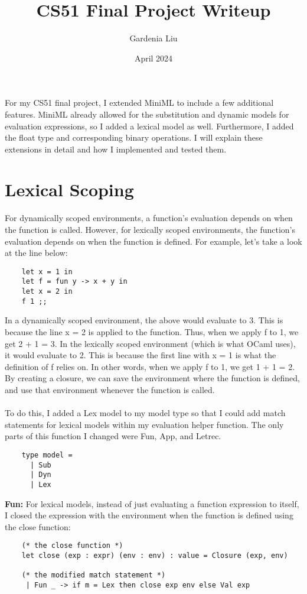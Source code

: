 \documentclass{article}
\title{CS51 Final Project Writeup}
\author{Gardenia Liu}
\date{April 2024}
\begin{document}
\maketitle
For my CS51 final project, I extended  MiniML to include a few additional features. MiniML already allowed for the substitution and dynamic models for evaluation expressions, so I added a lexical model as well. Furthermore, I added the float type and corresponding binary operations. I will explain these extensions in detail and how I implemented and tested them. 
\section{Lexical Scoping}
For dynamically scoped environments, a function's evaluation depends on when the function is called. However, for lexically scoped environments, the function's evaluation depends on when the function is defined. For example, let's take a look at the line below:
\begin{verbatim}
    let x = 1 in
    let f = fun y -> x + y in
    let x = 2 in
    f 1 ;;
\end{verbatim}
In a dynamically scoped environment, the above would evaluate to 3. This is because the line x = 2 is applied to the function. Thus, when we apply f to 1, we get 2 + 1 = 3. In the lexically scoped environment (which is what OCaml uses), it would evaluate to 2. This is because the first line with x = 1 is what the definition of f relies on. In other words, when we apply f to 1, we get 1 + 1 = 2. By creating a closure, we can save the environment where the function is defined, and use that environment whenever the function is called. \\\\
To do this, I added a Lex model to my model type so that I could add match statements for lexical models within my evaluation helper function. The only parts of this function I changed were Fun, App, and Letrec.
\begin{verbatim}
    type model = 
      | Sub 
      | Dyn 
      | Lex
\end{verbatim}
\newpage
\textbf{Fun:} For lexical models, instead of just evaluating a function expression to itself, I closed the expression with the environment when the function is defined using the close function:
\begin{verbatim}
    (* the close function *)
    let close (exp : expr) (env : env) : value = Closure (exp, env)
    
    (* the modified match statement *)
     | Fun _ -> if m = Lex then close exp env else Val exp
\end{verbatim}
\end{document}
